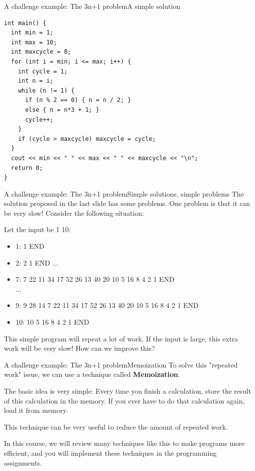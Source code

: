 \begin{frame}[fragile]{A challenge example: The 3n+1 problem}{A simple solution}
{\smaller
\begin{verbatim}
int main() {
  int min = 1;
  int max = 10;
  int maxcycle = 0;
  for (int i = min; i <= max; i++) {
    int cycle = 1;
    int n = i;
    while (n != 1) {
      if (n % 2 == 0) { n = n / 2; }
      else { n = n*3 + 1; }
      cycle++;
    }
    if (cycle > maxcycle) maxcycle = cycle;
  }
  cout << min << " " << max << " " << maxcycle << "\n";
  return 0;
}
\end{verbatim}}
\end{frame}

\begin{frame}{A challenge example: The 3n+1 problem}{Simple solutions, simple
  problems}
The solution proposed in the last slide has some problems. One problem is that
it can be very slow! Consider the following situation:
\bigskip

Let the input be 1 10:
\begin{itemize}
  \item 1: 1 END
  \item 2: 2 1 END
  ...
  \item 7: 7 22 11 34 17 52 26 13 40 20 10 5 16 8 4 2 1 END\\
  ...
  \item 9: 9 28 14 \alert{7 22 11 34 17 52 26 13 40 20 10 5 16 8 4 2 1 END}
  \item 10: \alert{10 5 16 8 4 2 1 END}
\end{itemize}
\bigskip

This simple program will repeat a lot of work. If the input is large, this
extra work will be very slow! How can we improve this?
\end{frame}

\begin{frame}{A challenge example: The 3n+1 problem}{Memoization}
  To solve this "repeated work" issue, we can use a technique called
  {\bf Memoization}.
  \medskip

  The basic idea is very simple: Every time you finish a calculation,
  store the result of this calculation in the memory. If you ever have to
  do that calculation again, load it from memory.
  \medskip

  This technique can be very useful to reduce the amount of repeated work.
  \bigskip

  In this course, we will review many techniques like this to make programs more efficient, and you will implement these techniques in the programming assignments.
\end{frame}

